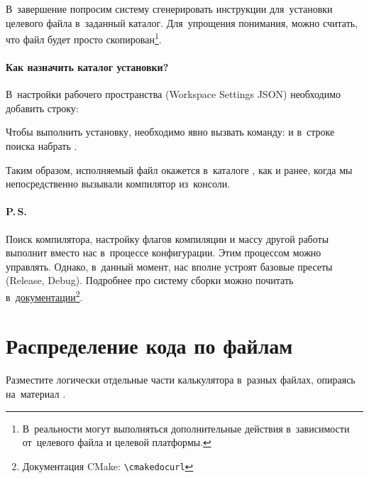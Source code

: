 
В~завершение попросим систему сгенерировать инструкции для~установки целевого файла в~заданный каталог. Для~упрощения понимания, можно считать, что файл будет просто скопирован\footnote{В~реальности могут выполняться дополнительные действия в~зависимости от~целевого файла и целевой платформы.}.




\paragraph{Как назначить каталог установки?}
В~настройки рабочего пространства (\textenglish{Workspace Settings JSON}) необходимо добавить строку:


Чтобы выполнить установку, необходимо явно вызвать команду:  и в~строке поиска набрать .

Таким образом, исполняемый файл окажется в~каталоге , как и ранее, когда мы непосредственно вызывали компилятор из~консоли.



\paragraph{P.\,S.}
Поиск компилятора, настройку флагов компиляции и массу другой работы  выполнит вместо нас в~процессе конфигурации. Этим процессом можно управлять. Однако, в~данный момент, нас вполне устроят базовые пресеты (\textenglish{Release, Debug}). Подробнее про систему сборки  можно почитать в~\href{\cmakedocurl}{документации}\footnote{Документация CMake: \nolinkurl{\cmakedocurl}}.



\section{Распределение кода по файлам}
Разместите логически отдельные части калькулятора в~разных файлах, опираясь на~материал .

